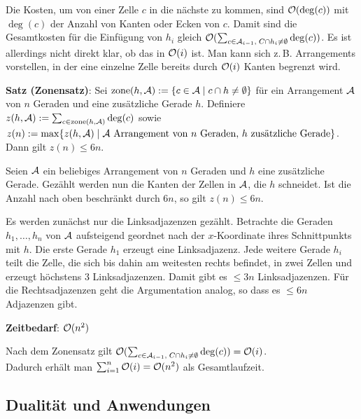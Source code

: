 Die Kosten, um von einer Zelle $c$ in die nächste zu kommen, sind $\mathcal{O}(\deg(c))$ mit
$\deg(c)$ der Anzahl von Kanten oder Ecken von $c$.
Damit sind die Gesamtkosten für die Einfügung von $h_i$ gleich
$\mathcal{O}(\sum_{c \in \mathcal{A}_{i-1},\; C \cap h_i \not= \emptyset} \deg(c))$.
Es ist allerdings nicht direkt klar, ob das in $\mathcal{O}(i)$ ist.
Man kann sich z.\,B. Arrangements vorstellen, in der eine einzelne Zelle bereits durch $\mathcal{O}(i)$
Kanten begrenzt wird.

\linie

\textbf{Satz (Zonensatz)}:
Sei $\operatorname{zone}(h, \mathcal{A}) := \{c \in \mathcal{A} \;|\; c \cap h \not= \emptyset\}$
für ein Arrangement $\mathcal{A}$ von $n$ Geraden und eine zusätzliche Gerade $h$.
Definiere $z(h, \mathcal{A}) := \sum_{c \in \operatorname{zone}(h, \mathcal{A})} \deg(c)$ sowie\\
$z(n) := \max\{z(h, \mathcal{A}) \;|\; \text{$\mathcal{A}$ Arrangement von $n$ Geraden, $h$ zusätzliche Gerade}\}$.\\
Dann gilt $z(n) \le 6n$.

\begin{Beweis}
    Seien $\mathcal{A}$ ein beliebiges Arrangement von $n$ Geraden und $h$ eine zusätzliche Gerade.
    Gezählt werden nun die Kanten der Zellen in $\mathcal{A}$, die $h$ schneidet.
    Ist die Anzahl nach oben beschränkt durch $6n$, so gilt $z(n) \le 6n$.
    
    Es werden zunächst nur die Linksadjazenzen gezählt.
    Betrachte die Geraden $h_1, \dotsc, h_n$ von $\mathcal{A}$ aufsteigend geordnet nach der $x$-Koordinate
    ihres Schnittpunkts mit $h$.
    Die erste Gerade $h_1$ erzeugt eine Linksadjazenz.
    Jede weitere Gerade $h_i$ teilt die Zelle, die sich bis dahin am weitesten rechts befindet,
    in zwei Zellen und erzeugt höchstens $3$ Linksadjazenzen.
    Damit gibt es $\le 3n$ Linksadjazenzen.
    Für die Rechtsadjazenzen geht die Argumentation analog, so dass es
    $\le 6n$ Adjazenzen gibt.
\end{Beweis}

\linie

\textbf{Zeitbedarf}:
$\mathcal{O}(n^2)$

\begin{Beweis}
    Nach dem Zonensatz gilt
    $\mathcal{O}(\sum_{c \in \mathcal{A}_{i-1},\; C \cap h_i \not= \emptyset} \deg(c)) = \mathcal{O}(i)$.\\
    Dadurch erhält man $\sum_{i=1}^n \mathcal{O}(i) = \mathcal{O}(n^2)$ als Gesamtlaufzeit.
\end{Beweis}

\pagebreak

\subsection{%
    Dualität und Anwendungen%
}

